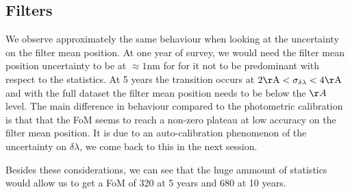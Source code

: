 \documentclass[\docopts]{\docclass}
\begin{document}
\subsection{Filters}
We observe approximately the same behaviour when looking at the uncertainty on the filter mean position. At one year of survey, we would need the filter mean position uncertainty to be at  $\approx 1\mathrm{nm}$ for for it not to be predominant with respect to the statistics. At 5 years the transition occurs at $2 \mathrm{\AA} < \sigma_{\delta\lambda} < 4 \mathrm{\AA}$ and with the full dataset the filter mean position needs to be below the $\AA$ level. The main difference in behaviour compared to the photometric calibration is that that the FoM seems to reach a non-zero plateau at low accuracy on the filter mean position. It is due to an auto-calibration phenomenon of the uncertainty on $\delta\lambda$, we come back to this in the next session.

Besides these considerations, we can see that the huge ammount of statistics would allow us to get a FoM of 320 at 5 years and 680 at 10 years.
\end{document}
